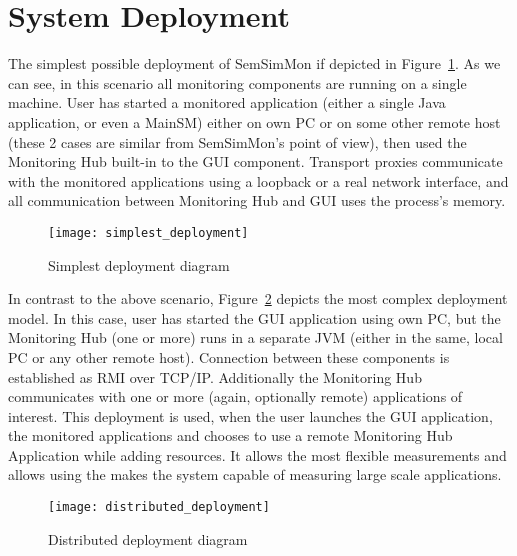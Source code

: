 %


\section{System Deployment}
\label{sec:deployments}

The simplest possible deployment of SemSimMon if depicted in Figure~\ref{fig:depl_simple}. As we can see, in this scenario all monitoring components are running on a single machine. User has started a monitored application (either a single Java application, or even a MainSM) either on own PC or on some other remote host (these 2 cases are similar from SemSimMon\rq{}s point of view), then used the Monitoring Hub built-in to the GUI component. Transport proxies communicate with the monitored applications using a loopback or a real network interface, and all communication between Monitoring Hub and GUI uses the process\rq{}s memory.

\begin{figure}[h]
   \centering
   \texttt{[image: simplest\_deployment]}
   \caption{Simplest deployment diagram}
   \label{fig:depl_simple}
 \end{figure}
 
In contrast to the above scenario, Figure~\ref{fig:depl_complex} depicts the most complex deployment model. In this case, user has started the GUI application using own PC, but the Monitoring Hub (one or more) runs in a separate JVM (either in the same, local PC or any other remote host). Connection between these components is established as RMI over TCP/IP. Additionally the Monitoring Hub communicates with one or more (again, optionally remote) applications of interest. This deployment is used, when the user launches the GUI application, the monitored applications and chooses to use a remote Monitoring Hub Application while adding resources. It allows the most flexible measurements and allows using the makes the system capable of measuring large scale applications.

\begin{figure}[h]
   \centering
   \texttt{[image: distributed\_deployment]}
   \caption{Distributed deployment diagram}
   \label{fig:depl_complex}
 \end{figure}
